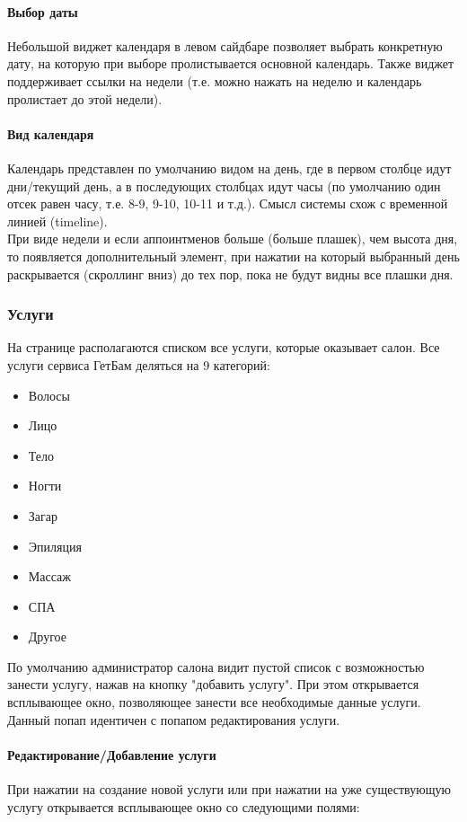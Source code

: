 \documentclass[DIV=calc, paper=a4, fontsize=11pt]{scrartcl} %
\begin{document}
\paragraph{Выбор даты}
Небольшой виджет календаря в левом сайдбаре позволяет выбрать конкретную дату, на которую при выборе пролистывается основной календарь. Также виджет поддерживает ссылки на недели (т.е. можно нажать на неделю и календарь пролистает до этой недели).
\paragraph{Вид календаря}
Календарь представлен по умолчанию видом на день, где в первом столбце идут дни/текущий день, а в последующих столбцах идут часы (по умолчанию один отсек равен часу, т.е. 8-9, 9-10, 10-11 и т.д.). Смысл системы схож с временной линией (timeline).
\\[0.5cm]
При виде недели и если аппоинтменов больше (больше плашек), чем высота дня, то появляется дополнительный элемент, при нажатии на который выбранный день раскрывается (скроллинг вниз) до тех пор, пока не будут видны все плашки дня.
 

\subsubsection{Услуги}

На странице располагаются списком все услуги, которые оказывает салон. Все услуги сервиса ГетБам деляться на 9 категорий:

\begin{itemize}
	\item Волосы
	\item Лицо
	\item Тело
	\item Ногти
	\item Загар
	\item Эпиляция
	\item Массаж
	\item СПА
	\item Другое
\end{itemize}

По умолчанию администратор салона видит пустой список с возможностью занести услугу, нажав на кнопку "добавить услугу". При этом открывается всплывающее окно, позволяющее занести все необходимые данные услуги. Данный попап идентичен с попапом редактирования услуги.

\paragraph{Редактирование/Добавление услуги} \label{paragraph:edit_service}
При нажатии на создание новой услуги или при нажатии на уже существующую услугу открывается всплывающее окно со следующими полями:
\end{document}
